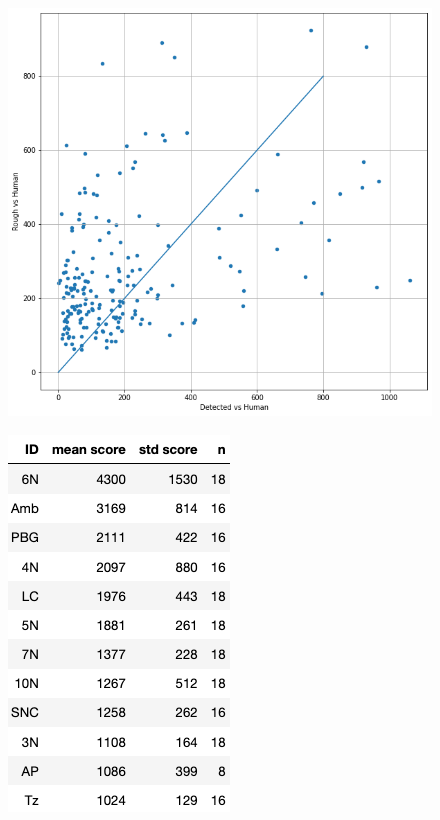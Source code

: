 \documentclass[runningheads]{llncs}
\begin{document}
\begin{figure}[t]
  \includegraphics[width=\textwidth]{figures/RoughVSDEtection.png}
  \caption{}
\end{figure}

\begin{figure}[t]
  \includegraphics[width=\textwidth]{figures/ScoresOfStructures.png}
  \caption{}
\end{figure}
\end{document}
